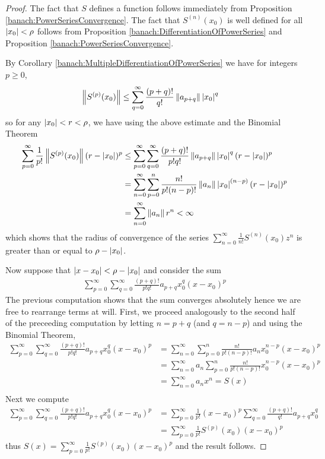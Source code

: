 \begin{proof}
  The fact that $S$ defines a function follows immediately from Proposition \ref{banach:PowerSeriesConvergence}.   The fact that $S^{(n)}(x_0)$ is well defined for all $\left \vert x_0 \right \vert < \rho$ follows from Proposition \ref{banach:DifferentiationOfPowerSeries} and Proposition \ref{banach:PowerSeriesConvergence}.

By Corollary \ref{banach:MultipleDifferentiationOfPowerSeries} we have for integers $p \geq 0$,
\begin{align*}
  \left \lVert S^{(p)}(x_0) \right \rVert &\leq \sum_{q = 0}^\infty \frac{(p + q)!}{q!} \left \lVert a_{p + q} \right \rVert \left \vert x_0 \right \vert^q
\end{align*}
so for any $\left \vert x_0 \right \vert < r < \rho$, we have using the above estimate and the Binomial Theorem
\begin{align*}
  \sum_{p=0}^\infty \frac{1}{p!} \left \lVert S^{(p)}(x_0) \right \rVert (r - \left \vert x_0 \right \vert)^p
  &\leq \sum_{p=0}^\infty \sum_{q=0}^\infty \frac{(p + q)!}{p!q!} \left \lVert a_{p + q} \right \rVert \left \vert x_0 \right \vert^q (r - \left \vert x_0 \right \vert)^p \\
  &= \sum_{n=0}^\infty \sum_{p=0}^n \frac{n!}{p!(n-p)!} \left \lVert a_{n} \right \rVert \left \vert x_0 \right \vert^{(n-p)} (r - \left \vert x_0 \right \vert)^p \\
  &= \sum_{n=0}^\infty \left \lVert a_{n} \right \rVert r^n < \infty\\
\end{align*}
which shows that the radius of convergence of the series $\sum_{n=0}^\infty \frac{1}{n!} S^{(n)}(x_0) z^n$ is greater than or equal to $\rho - \left \vert x_0 \right \vert$.

Now suppose that $\left \vert x - x_0 \right \vert < \rho - \left \vert x_0 \right \vert$ and consider the sum
\begin{align*}
  \sum_{p=0}^\infty \sum_{q=0}^\infty \frac{(p + q)!}{p!q!} a_{p + q} x_0^q (x - x_0)^p
\end{align*}
The previous computation shows that the sum converges absolutely hence we are free to rearrange terms at will.   First, we proceed analogously to the second half of the preceeding computation by letting $n=p+q$ (and $q=n-p$) and using the Binomial Theorem,
\begin{align*}
  \sum_{p=0}^\infty \sum_{q=0}^\infty \frac{(p + q)!}{p!q!} a_{p + q} x_0^q (x - x_0)^p
  &= \sum_{n=0}^\infty \sum_{p=0}^n \frac{n!}{p!(n-p)!} a_{n} x_0^{n-p} (x - x_0)^p \\
  &= \sum_{n=0}^\infty a_{n} \sum_{p=0}^n \frac{n!}{p!(n-p)!} x_0^{n-p} (x - x_0)^p \\
  &= \sum_{n=0}^\infty a_{n} x^n = S(x)\\
\end{align*}
Next we compute
\begin{align*}
  \sum_{p=0}^\infty \sum_{q=0}^\infty \frac{(p + q)!}{p!q!} a_{p + q} x_0^q (x - x_0)^p
  &=  \sum_{p=0}^\infty \frac{1}{p!} (x - x_0)^p \sum_{q=0}^\infty \frac{(p + q)!}{q!} a_{p + q} x_0^q \\
  &= \sum_{p=0}^\infty \frac{1}{p!} S^{(p)}(x_0) (x - x_0)^p 
\end{align*}
thus $S(x) = \sum_{p=0}^\infty \frac{1}{p!} S^{(p)}(x_0) (x - x_0)^p $ and the result follows.
\end{proof}

